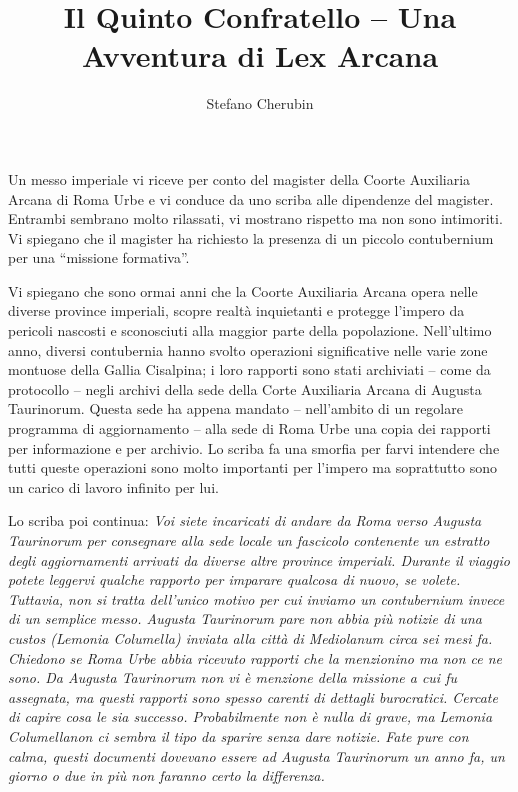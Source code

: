 \documentclass[11.5pt,twocolumn]{article}
\newcommand\custosmorta{Lemonia Columella}
\begin{document}
\title{Il Quinto Confratello -- Una Avventura di Lex Arcana}

\author{Stefano Cherubin}
\date{}

\maketitle

Un messo imperiale vi riceve per conto del magister della Coorte Auxiliaria Arcana di Roma Urbe e vi conduce da uno scriba alle dipendenze del magister.
Entrambi sembrano molto rilassati, vi mostrano rispetto ma non sono intimoriti.
Vi spiegano che il magister ha richiesto la presenza di un piccolo contubernium per una ``missione formativa''.

Vi spiegano che sono ormai anni che la Coorte Auxiliaria Arcana opera nelle diverse province imperiali, scopre realt\`{a} inquietanti e protegge l'impero da pericoli nascosti e sconosciuti alla maggior parte della popolazione.
Nell'ultimo anno, diversi contubernia hanno svolto operazioni significative nelle varie zone montuose della Gallia Cisalpina; i loro rapporti sono stati archiviati -- come da protocollo -- negli archivi della sede della Corte Auxiliaria Arcana di Augusta Taurinorum.
Questa sede ha appena mandato -- nell'ambito di un regolare programma di aggiornamento -- alla sede di Roma Urbe una copia dei rapporti per informazione e per archivio.
Lo scriba fa una smorfia per farvi intendere che tutti queste operazioni sono molto importanti per l'impero ma soprattutto sono un carico di lavoro infinito per lui.

Lo scriba poi continua: \emph{%
Voi siete incaricati di andare da Roma verso Augusta Taurinorum per consegnare alla sede locale un fascicolo contenente un estratto degli aggiornamenti arrivati da diverse altre province imperiali.
Durante il viaggio potete leggervi qualche rapporto per imparare qualcosa di nuovo, se volete.
Tuttavia, non si tratta dell'unico motivo per cui inviamo un contubernium invece di un semplice messo.
Augusta Taurinorum pare non abbia pi\`{u} notizie di una custos (\custosmorta) inviata alla citt\`{a} di Mediolanum circa sei mesi fa.
Chiedono se Roma Urbe abbia ricevuto rapporti che la menzionino ma non ce ne sono.
Da Augusta Taurinorum non vi \`{e} menzione della missione a cui fu assegnata, ma questi rapporti sono spesso carenti di dettagli burocratici.
Cercate di capire cosa le sia successo.
Probabilmente non \`{e} nulla di grave, ma \custosmorta non ci sembra il tipo da sparire senza dare notizie.
Fate pure con calma, questi documenti dovevano essere ad Augusta Taurinorum un anno fa, un giorno o due in pi\`{u} non faranno certo la differenza.
}
\end{document}
